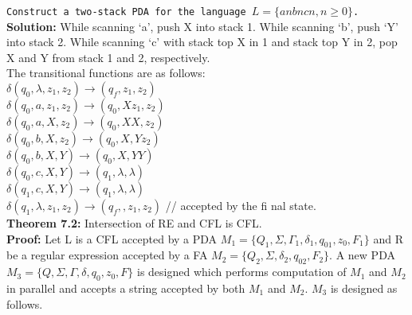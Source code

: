 \documentclass{article}
\begin{document}
\hspace*{0.1cm} \texttt{\small{Construct a two-stack PDA for the language $L = \{anbncn, n \geq 0\}$.}}\\

\textbf{Solution:} While scanning ‘a’, push X into stack 1. While scanning ‘b’, push ‘Y’ into stack 2. While
scanning ‘c’ with stack top X in 1 and stack top Y in 2, pop X and Y from stack 1 and 2, respectively.\\
The transitional functions are as follows:\\

\hspace*{2.5cm} $\delta(q_0, \lambda, z_1, z_2) \rightarrow (q_f , z_1, z_2)$ \\
\hspace*{2.5cm} $\delta(q_0, a, z_1, z_2) \rightarrow (q_0, Xz_1, z_2)$ \\
\hspace*{2.5cm} $\delta(q_0, a, X, z_2) \rightarrow (q_0, XX, z_2)$ \\
\hspace*{2.5cm} $\delta(q_0, b, X, z_2) \rightarrow (q_0, X, Yz_2)$ \\
\hspace*{2.5cm} $\delta(q_0, b, X, Y) \rightarrow (q_0, X, YY)$ \\
\hspace*{2.5cm} $\delta(q_0, c, X, Y) \rightarrow (q_1, \lambda, \lambda)$ \\
\hspace*{2.5cm} $\delta(q_1, c, X, Y) \rightarrow (q_1, \lambda, \lambda)$ \\
\hspace*{2.5cm} $\delta(q_1, \lambda, z_1, z_2) \rightarrow (q_f ,, z_1, z_2)$ // accepted by the fi nal state.\\

\vspace*{0.1cm}
\textbf{Theorem 7.2:} Intersection of RE and CFL is CFL.\\

\vspace*{0.1cm}
\textbf{Proof:} Let L is a CFL accepted by a PDA $M_1 = \{Q_1, \Sigma, \Gamma_1, \delta_1, q_01, z_0, F_1\}$ and R be a regular expression
accepted by a FA $M_2 = \{Q_2, \Sigma, \delta_2, q_02, F_2\}$. A new PDA $M_3 = \{Q, \Sigma, \Gamma, \delta, q_0, z_0, F\}$ is designed
which performs computation of $M_1$ and $M_2$ in parallel and accepts a string accepted by both $M_1$ and $M_2$.
$M_3$ is designed as follows.\\
\end{document}
